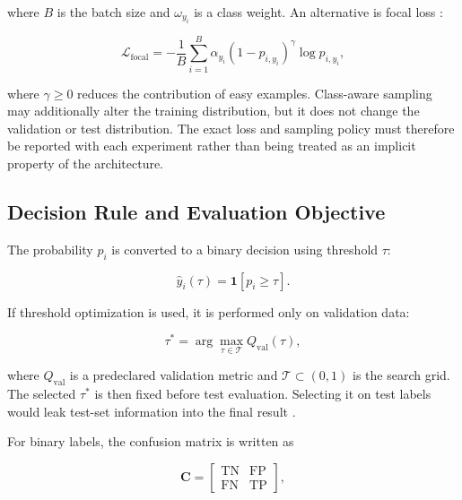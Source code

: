 where $B$ is the batch size and $\omega_{y_i}$ is a class weight. An alternative
is focal loss \cite{Lin2017FocalLoss}:

\begin{equation}
\mathcal{L}_{\mathrm{focal}}
=
-\frac{1}{B}
\sum_{i=1}^{B}
\alpha_{y_i}
\left(1-p_{i,y_i}\right)^{\gamma}
\log p_{i,y_i},
\label{eq:focal_loss}
\end{equation}

where $\gamma\geq0$ reduces the contribution of easy examples. Class-aware
sampling may additionally alter the training distribution, but it does not
change the validation or test distribution. The exact loss and sampling policy
must therefore be reported with each experiment rather than being treated as an
implicit property of the architecture.

\subsection{Decision Rule and Evaluation Objective}
\label{subsec:pf_evaluation}

The probability $p_i$ is converted to a binary decision using threshold
$\tau$:

\begin{equation}
\widehat{y}_i(\tau)=\mathbf{1}[p_i\geq\tau].
\label{eq:decision_rule}
\end{equation}

If threshold optimization is used, it is performed only on validation data:

\begin{equation}
\tau^{*}
=
\arg\max_{\tau\in\mathcal{T}}
Q_{\mathrm{val}}(\tau),
\label{eq:threshold_selection}
\end{equation}

where $Q_{\mathrm{val}}$ is a predeclared validation metric and
$\mathcal{T}\subset(0,1)$ is the search grid. The selected $\tau^{*}$ is then
fixed before test evaluation. Selecting it on test labels would leak test-set
information into the final result \cite{Arp2022DosDonts}.

For binary labels, the confusion matrix is written as

\begin{equation}
\mathbf{C}
=
\begin{bmatrix}
\mathrm{TN} & \mathrm{FP}\\
\mathrm{FN} & \mathrm{TP}
\end{bmatrix},
\label{eq:confusion_matrix}
\end{equation}

